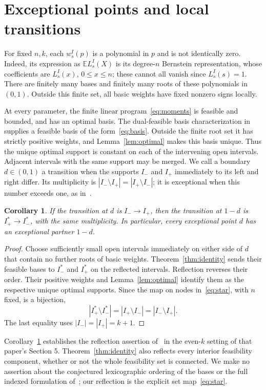 \documentclass[11pt]{article}
\newtheorem{corollary}[theorem]{Corollary}
\theoremstyle{remark}
\newcommand{\E}{\mathbb E}
\begin{document}
\section{Exceptional points and local transitions}

For fixed $n,k$, each $w_s^I(p)$ is a polynomial in $p$ and is not identically zero. Indeed, its expression as $\E L_s^I(X)$ is its degree-$n$ Bernstein representation, whose coefficients are $L_s^I(x)$, $0\le x\le n$; these cannot all vanish since $L_s^I(s)=1$.
There are finitely many bases and finitely many roots of these polynomials in $(0,1)$.
Outside this finite set, all basic weights have fixed nonzero signs locally.

At every parameter, the finite linear program~\eqref{eq:moments} is feasible and bounded, and has an optimal basis. The dual-feasible basis characterization in~\cite[Theorem 3.3]{BEKK} supplies a feasible basis of the form~\eqref{eq:basis}. Outside the finite root set it has strictly positive weights, and Lemma~\ref{lem:optimal} makes this basis unique. Thus the unique optimal support is constant on each of the intervening open intervals.
Adjacent intervals with the same support may be merged. We call a boundary $d\in(0,1)$ a transition when the supports $I_-$ and $I_+$ immediately to its left and right differ. Its multiplicity is $|I_-\setminus I_+|=|I_+\setminus I_-|$; it is exceptional when this number exceeds one, as in~\cite[Section 5.3]{BEKK}.

\begin{corollary}\label{cor:transition}
If the transition at $d$ is $I_-\longrightarrow I_+$, then the transition at $1-d$ is $I_+^*\longrightarrow I_-^*$, with the same multiplicity. In particular, every exceptional point $d$ has an exceptional partner $1-d$.
\end{corollary}
\begin{proof}
Choose sufficiently small open intervals immediately on either side of $d$ that contain no further roots of basic weights. Theorem~\ref{thm:identity} sends their feasible bases to $I_-^*$ and $I_+^*$ on the reflected intervals. Reflection reverses their order. Their positive weights and Lemma~\ref{lem:optimal} identify them as the respective unique optimal supports. Since the map on nodes in~\eqref{eq:star}, with $n$ fixed, is a bijection,
\[
 |I_+^*\setminus I_-^*|=|I_+\setminus I_-|=|I_-\setminus I_+|.
\]
The last equality uses $|I_-|=|I_+|=k+1$.
\end{proof}

Corollary~\ref{cor:transition} establishes the reflection assertion of~\cite[Conjecture 5.11]{BEKK} in the even-$k$ setting of that paper's Section 5. Theorem~\ref{thm:identity} also reflects every interior feasibility component, whether or not the whole feasibility set is connected. We make no assertion about the conjectured lexicographic ordering of the bases or the full indexed formulation of~\cite[Conjecture 5.10]{BEKK}; our reflection is the explicit set map~\eqref{eq:star}.
\end{document}
